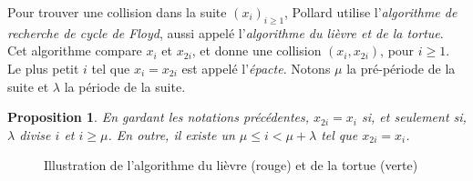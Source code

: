 \documentclass[a4paper, titlepage, 11pt]{article}
\newtheorem{prop}[theo]{Proposition}
\theoremstyle{definition}
\theoremstyle{remark}
\begin{document}
Pour trouver une collision dans la suite ${(x_i)}_{i\geqslant 1}$, Pollard utilise l'\textit{algorithme de recherche de cycle de Floyd}, aussi appelé l'\textit{algorithme du lièvre et de la tortue}.
Cet algorithme compare $x_i$ et $x_{2i}$, et donne une collision $(x_i, x_{2i})$, pour $i \geqslant 1$. Le plus petit $i$ tel que $x_i = x_{2i}$ est appelé l'\textit{épacte}.
Notons $\mu$ la pré-période de la suite et $\lambda$ la période de la suite.

\begin{prop}\label{prop:floyd}
En gardant les notations précédentes, $x_{2i} = x_i$ si, et seulement si, $\lambda$ divise $i$ et $i \geqslant \mu$. En outre, il existe un $\mu \leqslant i < \mu + \lambda$ tel que $x_{2i} = x_i$.
\end{prop}

\begin{figure}[h]\caption{Illustration de l'algorithme du lièvre (rouge) et de la tortue (verte)}
\begin{center}
\begin{tikzpicture}


\end{tikzpicture}
\end{center}
\end{figure}
\end{document}

